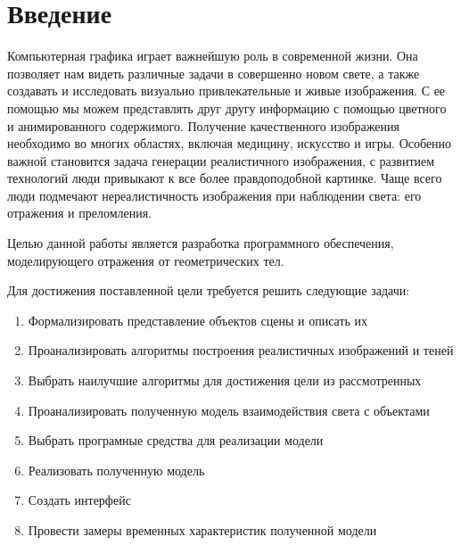 \chapter{Введение}

Компьютерная графика играет важнейшую роль в современной жизни. 
Она позволяет нам видеть различные задачи в совершенно новом свете, а также создавать и исследовать визуально привлекательные и живые изображения.
С ее помощью мы можем представлять друг другу информацию с помощью цветного и анимированного содержимого. 
Получение качественного изображения необходимо во многих областях, включая медицину, искусство и игры.
Особенно важной становится задача генерации реалистичного изображения, с развитием технологий люди привыкают к все более
правдоподобной картинке. Чаще всего люди подмечают нереалистичность изображения при наблюдении света: его отражения и преломления.


Целью данной работы является разработка программного обеспечения, моделирующего отражения от геометрических тел.

Для достижения поставленной цели требуется решить следующие задачи:
\begin{enumerate}
	\item Формализировать представление объектов сцены и описать их
	\item Проанализировать алгоритмы построения реалистичных изображений и теней
	\item Выбрать наилучшие алгоритмы для достижения цели  из рассмотренных
	\item Проанализировать полученную  модель взаимодействия света с объектами
	\item Выбрать програмные средства для реализации модели
	\item Реализовать полученную модель
	\item Создать интерфейс
	\item Провести замеры временных характеристик полученной модели
\end{enumerate}
